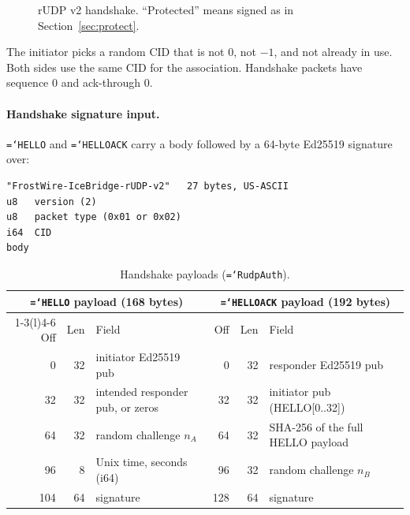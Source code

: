 \documentclass[11pt,a4paper]{article}
\newcommand{\code}[1]{\texttt{\hyphenchar\font=`\-\relax #1}}
\DeclareRobustCommand{\_}{\origunderscore\allowbreak}
\begin{document}
\begin{figure}[ht]
\centering
{}
\caption{rUDP v2 handshake. ``Protected'' means signed as in Section~\ref{sec:protect}.}
\label{fig:handshake}
\end{figure}

The initiator picks a random CID that is not 0, not $-1$, and not already in use. Both sides
use the same CID for the association. Handshake packets have sequence 0 and ack-through 0.

\paragraph{Handshake signature input.} \code{HELLO} and \code{HELLO\_ACK} carry a body
followed by a 64-byte Ed25519 signature over:
\begin{lstlisting}
"FrostWire-IceBridge-rUDP-v2"   27 bytes, US-ASCII
u8   version (2)
u8   packet type (0x01 or 0x02)
i64  CID
body
\end{lstlisting}

\begin{table}[ht]
\centering\small
\begin{tabular}{rrl@{\qquad}rrl}
\toprule
\multicolumn{3}{c}{\code{HELLO} payload (168 bytes)} & \multicolumn{3}{c}{\code{HELLO\_ACK} payload (192 bytes)}\\
\cmidrule(r){1-3}\cmidrule(l){4-6}
Off & Len & Field & Off & Len & Field\\
\midrule
0 & 32 & initiator Ed25519 pub & 0 & 32 & responder Ed25519 pub\\
32 & 32 & intended responder pub, or zeros & 32 & 32 & initiator pub (HELLO[0..32])\\
64 & 32 & random challenge $n_A$ & 64 & 32 & SHA-256 of the full HELLO payload\\
96 & 8 & Unix time, seconds (i64) & 96 & 32 & random challenge $n_B$\\
104 & 64 & signature & 128 & 64 & signature\\
\bottomrule
\end{tabular}
\caption{Handshake payloads (\code{RudpAuth}).}
\label{tab:hello}
\end{table}
\end{document}
